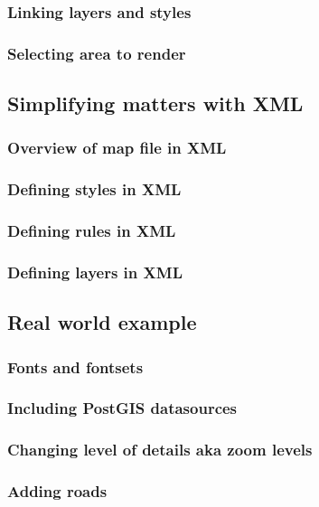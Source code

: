\documentclass{beamer}
\begin{document}
\begin{frame}
  \frametitle{Linking layers and styles}

\end{frame}

\begin{frame}
  \frametitle{Selecting area to render}

\end{frame}

\subsection{Simplifying matters with XML}

\begin{frame}
  \frametitle{Overview of map file in XML}

\end{frame}

\begin{frame}
  \frametitle{Defining styles in XML}

\end{frame}

\begin{frame}
  \frametitle{Defining rules in XML}

\end{frame}

\begin{frame}
  \frametitle{Defining layers in XML}

\end{frame}

\subsection{Real world example}

\begin{frame}
  \frametitle{Fonts and fontsets}

\end{frame}

\begin{frame}
  \frametitle{Including PostGIS datasources}

\end{frame}

\begin{frame}
  \frametitle{Changing level of details aka zoom levels}

\end{frame}

\begin{frame}
  \frametitle{Adding roads}

\end{frame}
\end{document}
